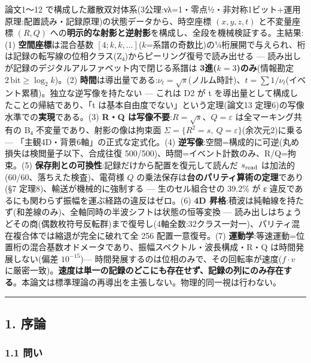 \documentclass[
]{ltjsarticle}
\begin{document}
論文1〜12
で構成した離散双対体系(3公理:νλ=1・零点½・非対称1ビット+運用原理:配置読み・記録原理)の状態データから、時空座標
\((x,y,z,t)\) と不変量座標 \((R,Q)\)
への\textbf{明示的な射影と逆射影}を構成し、全段を機械検証する。主結果:(1)
\textbf{空間座標}は混合基数
\([4;k,k,\dots]\)(\(k\)=系譜の奇数比)の¼桁展開で与えられ、桁は記録の転写線の位相クラス(Z₄)からピーリング復号で読み出せる
--- 読み出しが記録のデジタルアルファベット内で閉じる系譜は
\textbf{3進(\(k{=}3\))のみ}(情報勘定
\(2\,\mathrm{bit}\ge\log_2 k\))。(2)
\textbf{時間}は導出量である:\(\nu_t=\sqrt{s}\)(ノルム時計)、\(t=\sum 1/\nu_t\)(イベント累積)。独立な逆写像を持たない
--- これは D2 が t を導出量として構成したことの帰結であり、「t
は基本自由度でない」という定理(論文13
定理6)の写像水準での\textbf{実現}である。(3) \textbf{R・Q
は写像不要}:\(R=\sqrt{s}\)、\(Q=\varepsilon\) は全マーキング共有の B₄
不変量であり、射影の像は拘束面
\(\Sigma=\{R^2=s,\ Q=\varepsilon\}\)(余次元2)に乗る ---
「主観4D・背景6軸」の正式な定式化。(4)
\textbf{逆写像}:空間=構成的に可逆(丸め損失は検閲量子以下、合成往復
500/500)、時間=イベント計数のみ、R/Q=拘束。(5)
\textbf{保存則との可換性}:記録だけから配置を復元して読んだ
\(s_{\rm read}\) は加法的(60/60、落ちえた検査)、電荷様 \(Q\)
の乗法保存は\textbf{台のパリティ算術の定理}であり(§7
定理8)、輸送が機械的に強制する --- 生のセル組合せの 39.2\% が ε
違反であるにも関わらず振幅を運ぶ経路の違反はゼロ。(6) \textbf{4D
昇格}:積波は純軸線を持たず(和差線のみ)、全軸同時の半波シフトは状態の恒等変換
---
読み出しはちょうどその商(偶数枚符号反転群)まで復号し(4軸全数:32クラス一対一)、パリティ混在複合体では縮退が完全に破れて全
256 配置一意復号。(7)
\textbf{運動学}:等速運動=位置桁の混合基数オドメータであり、振幅スペクトル・波長構成・R・Q
は時間発展しない(偏差 \(10^{-15}\))---
時間発展するのは位相のみで、その回転率が速度(\(f\cdot v\)
に厳密一致)。\textbf{速度は単一の記録のどこにも存在せず、記録の列にのみ存在する}。本論文は標準理論の再導出を主張しない。物理的同一視は行わない。

\begin{center}\rule{0.5\linewidth}{0.5pt}\end{center}

\subsection{1. 序論}\label{ux5e8fux8ad6}

\subsubsection{1.1 問い}\label{ux554fux3044}
\end{document}

